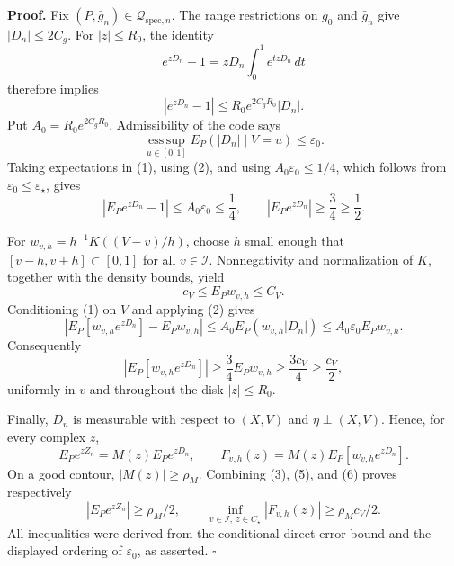 \textbf{Proof.}
Fix \((P,\bar g_n)\in\mathcal Q_{\mathrm{spec},n}\).  The range restrictions on \(g_0\) and \(\bar g_n\) give \(|D_n|\le2C_g\).  For \(|z|\le R_0\), the identity
\[
 e^{zD_n}-1=zD_n\int_0^1e^{tzD_n}\,dt
\]
therefore implies
\[
 |e^{zD_n}-1|
 \le R_0e^{2C_gR_0}|D_n|. \tag{1}
\]
Put \(A_0=R_0e^{2C_gR_0}\).  Admissibility of the code says
\[
 \operatorname*{ess\,sup}_{u\in[0,1]}E_P(|D_n|\mid V=u)\le\varepsilon_0. \tag{2}
\]
Taking expectations in (1), using (2), and using \(A_0\varepsilon_0\le1/4\), which follows from \(\varepsilon_0\le\varepsilon_\star\), gives
\[
 |E_Pe^{zD_n}-1|\le A_0\varepsilon_0\le\frac14,
 \qquad |E_Pe^{zD_n}|\ge\frac34\ge\frac12. \tag{3}
\]

For \(w_{v,h}=h^{-1}K((V-v)/h)\), choose \(h\) small enough that \([v-h,v+h]\subset[0,1]\) for all \(v\in\mathcal I\).  Nonnegativity and normalization of \(K\), together with the density bounds, yield
\[
 c_V\le E_Pw_{v,h}\le C_V. \tag{4}
\]
Conditioning (1) on \(V\) and applying (2) gives
\[
 \left|E_P[w_{v,h}e^{zD_n}]-E_Pw_{v,h}\right|
 \le A_0E_P(w_{v,h}|D_n|)
 \le A_0\varepsilon_0E_Pw_{v,h}.
\]
Consequently
\[
 \left|E_P[w_{v,h}e^{zD_n}]\right|
 \ge\frac34E_Pw_{v,h}\ge\frac{3c_V}{4}\ge\frac{c_V}{2}, \tag{5}
\]
uniformly in \(v\) and throughout the disk \(|z|\le R_0\).

Finally, \(D_n\) is measurable with respect to \((X,V)\) and \(\eta\perp(X,V)\).  Hence, for every complex \(z\),
\[
 E_Pe^{zZ_n}=M(z)E_Pe^{zD_n},
 \qquad
 F_{v,h}(z)=M(z)E_P[w_{v,h}e^{zD_n}]. \tag{6}
\]
On a good contour, \(|M(z)|\ge\rho_M\).  Combining (3), (5), and (6) proves respectively
\[
 |E_Pe^{zZ_n}|\ge\rho_M/2,
 \qquad
 \inf_{v\in\mathcal I,\ z\in C_\star}|F_{v,h}(z)|\ge\rho_Mc_V/2.
\]
All inequalities were derived from the conditional direct-error bound and the displayed ordering of \(\varepsilon_0\), as asserted. \(\square\)